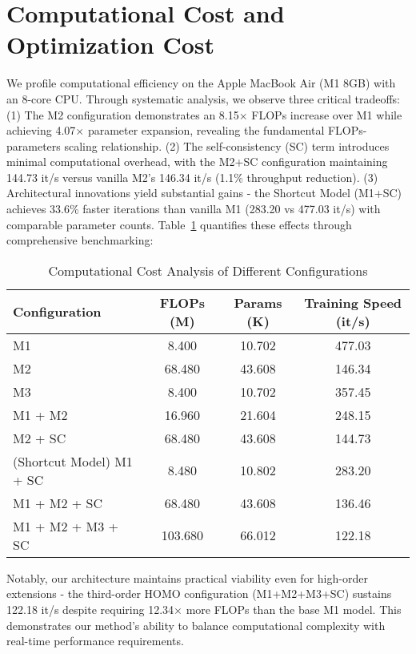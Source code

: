 \section{Computational Cost and Optimization Cost} \label{sec:app:computational_cost}
We profile computational efficiency on the Apple MacBook Air (M1 8GB) with an 8-core CPU. Through systematic analysis, we observe three critical tradeoffs: (1) The M2 configuration demonstrates an 8.15$\times$ FLOPs increase over M1 while achieving 4.07$\times$ parameter expansion, revealing the fundamental FLOPs-parameters scaling relationship. (2) The self-consistency (SC) term introduces minimal computational overhead, with the M2+SC configuration maintaining 144.73 it/s versus vanilla M2's 146.34 it/s (1.1\% throughput reduction). (3) Architectural innovations yield substantial gains - the Shortcut Model (M1+SC) achieves 33.6\% faster iterations than vanilla M1 (283.20 vs 477.03 it/s) with comparable parameter counts. Table~\ref{tab:computational_cost} quantifies these effects through comprehensive benchmarking:

\begin{table}[!ht]
\centering
\caption{Computational Cost Analysis of Different Configurations}
\label{tab:computational_cost}
\begin{tabular}{lccc}
\toprule
\textbf{Configuration} & \textbf{FLOPs (M)} & \textbf{Params (K)} & \textbf{Training Speed (it/s)} \\
\midrule
M1 & 8.400 & 10.702 & 477.03 \\
M2 & 68.480 & 43.608 & 146.34 \\ 
M3 & 8.400 & 10.702 & 357.45 \\
M1 + M2 & 16.960 & 21.604 & 248.15 \\
M2 + SC & 68.480 & 43.608 & 144.73 \\
(Shortcut Model) M1 + SC & 8.480 & 10.802 & 283.20 \\
M1 + M2 + SC & 68.480 & 43.608 & 136.46 \\
M1 + M2 + M3 + SC & 103.680 & 66.012 & 122.18 \\
\bottomrule
\end{tabular}
\end{table}

Notably, our architecture maintains practical viability even for high-order extensions - the third-order HOMO configuration (M1+M2+M3+SC) sustains 122.18 it/s despite requiring 12.34$\times$ more FLOPs than the base M1 model. This demonstrates our method's ability to balance computational complexity with real-time performance requirements. 